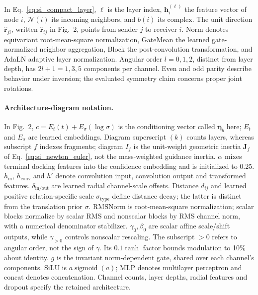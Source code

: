 \documentclass{article}
\renewcommand{\boldsymbol}[1]{\pmb{#1}}
\begin{document}
In Eq.~\eqref{eq:si_compact_layer}, \(\ell\) is the layer index, \(\mathbf h_i^{(\ell)}\) the feature vector of node \(i\), \(\mathcal N(i)\) its incoming neighbors, and \(b(i)\) its complex. The unit direction \(\widehat{\mathbf r}_{ji}\), written \(\widehat{\mathbf r}_{ij}\) in Fig.~2, points from sender \(j\) to receiver \(i\). Norm denotes equivariant root-mean-square normalization, GateMean the learned gate-normalized neighbor aggregation, Block the post-convolution transformation, and AdaLN adaptive layer normalization. Angular order \(l=0,1,2\), distinct from layer depth, has \(2l+1=1,3,5\) components per channel. Even and odd parity describe behavior under inversion; the evaluated symmetry claim concerns proper joint rotations.

\paragraph{Architecture-diagram notation.}
In Fig.~2, \(c=E_t(t)+E_\sigma(\log\sigma)\) is the conditioning vector called \(\boldsymbol\eta_b\) here; \(E_t\) and \(E_\sigma\) are learned embeddings. Diagram superscript \((k)\) counts layers, whereas subscript \(f\) indexes fragments; diagram \(I_f\) is the unit-weight geometric inertia \(\mathbf J_f\) of Eq.~\eqref{eq:si_newton_euler}, not the mass-weighted guidance inertia. \(\alpha\) mixes terminal docking features into the confidence embedding and is initialized to 0.25. \(h_{\mathrm{in}}\), \(h_{\mathrm{conv}}\) and \(h'\) denote convolution input, convolution output and transformed features. \(\delta_{\mathrm{in/out}}\) are learned radial channel-scale offsets. Distance \(d_{ij}\) and learned positive relation-specific scale \(\sigma_{\mathrm{type}}\) define distance decay; the latter is distinct from the translation prior \(\sigma\). RMSNorm is root-mean-square normalization; scalar blocks normalize by scalar RMS and nonscalar blocks by RMS channel norm, with a numerical denominator stabilizer. \(\gamma_0,\beta_0\) are scalar affine scale/shift outputs, while \(\gamma_{>0}\) controls nonscalar rescaling. The subscript \(>0\) refers to angular order, not the sign of \(\gamma\). Its \(0.1\tanh\) factor bounds modulation to 10\% about identity. \(g\) is the invariant norm-dependent gate, shared over each channel's components. SiLU is \(a\operatorname{sigmoid}(a)\); MLP denotes multilayer perceptron and concat denotes concatenation. Channel counts, layer depths, radial features and dropout specify the retained architecture.
\end{document}
